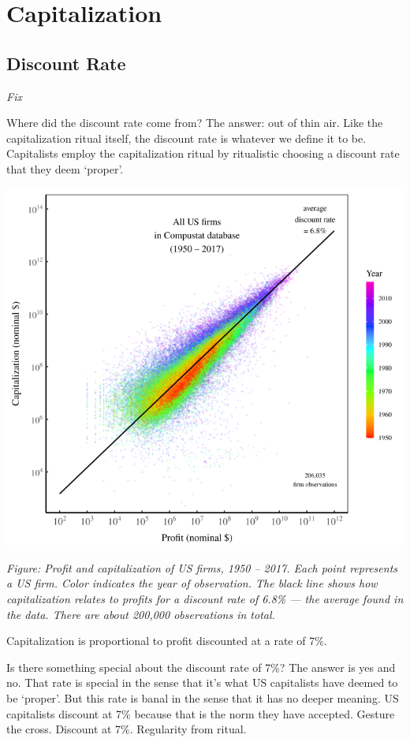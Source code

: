 \documentclass[
]{book}
\begin{document}
\hypertarget{capitalization}{%
\chapter{Capitalization}\label{capitalization}}

\hypertarget{discount-rate}{%
\section{Discount Rate}\label{discount-rate}}

\emph{Fix}

Where did the discount rate come from? The answer: out of thin air. Like the capitalization ritual itself, the discount rate is whatever we define it to be. Capitalists employ the capitalization ritual by ritualistic choosing a discount rate that they deem `proper'.

\includegraphics{fig/profit_cap.png}

\emph{Figure: Profit and capitalization of US firms, 1950 -- 2017. Each point represents a US firm. Color indicates the year of observation. The black line shows how capitalization relates to profits for a discount rate of 6.8\% --- the average found in the data. There are about 200,000 observations in total.}

Capitalization is proportional to profit discounted at a rate of 7\%.

Is there something special about the discount rate of 7\%? The answer is yes and no. That rate is special in the sense that it's what US capitalists have deemed to be `proper'. But this rate is banal in the sense that it has no deeper meaning. US capitalists discount at 7\% because that is the norm they have accepted. Gesture the cross. Discount at 7\%. Regularity from ritual.
\end{document}
